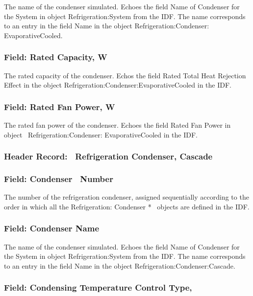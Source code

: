 The name of the condenser simulated. Echoes the field Name of Condenser for the System in object Refrigeration:System from the IDF. The name corresponds to an entry in the field Name in the object Refrigeration:Condenser: EvaporativeCooled.

\subsubsection{Field: Rated Capacity, W}\label{field-rated-capacity-w-2}

The rated capacity of the condenser. Echos the field Rated Total Heat Rejection Effect in the object Refrigeration:Condenser:EvaporativeCooled in the IDF.

\subsubsection{Field: Rated Fan Power, W}\label{field-rated-fan-power-w-1}

The rated fan power of the condenser. Echoes the field Rated Fan Power in object~ Refrigeration:Condenser: EvaporativeCooled in the IDF.

\subsubsection{Header Record:~ Refrigeration Condenser, Cascade}\label{header-record-refrigeration-condenser-cascade}

\subsubsection{Field: Condenser~ Number}\label{field-condenser-number-4}

The number of the refrigeration condenser, assigned sequentially according to the order in which all the Refrigeration: Condenser *~ objects are defined in the IDF.

\subsubsection{Field: Condenser Name}\label{field-condenser-name-4}

The name of the condenser simulated. Echoes the field Name of Condenser for the System in object Refrigeration:System from the IDF. The name corresponds to an entry in the field Name in the object Refrigeration:Condenser:Cascade.

\subsubsection{Field: Condensing Temperature Control Type,}\label{field-condensing-temperature-control-type}

